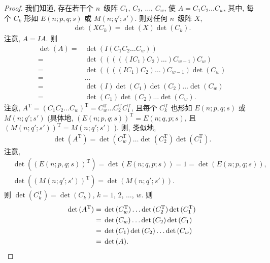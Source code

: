 \documentclass[../libro.tex]{subfiles}
\begin{document}
\begin{proof}
    我们知道,
    存在若干个 \(n\)~级阵
    \(C_1\), \(C_2\), \(\dots\), \(C_w\),
    使 \(A = C_1 C_2 \dots C_w\),
    其中, 每个 \(C_k\) 形如
    \(E(n; p, q; s)\) 或 \(M(n; q'; s')\).
    则对任何 \(n\)~级阵 \(X\),
    \begin{align*}
        \det {(X C_k)} = \det {(X)} \det {(C_k)}.
    \end{align*}
    注意, \(A = I A\).
    则
    \begin{align*}
        \det {(A)}
        = {} &
        \det {(I (C_1 C_2 \dots C_w))}
        \\
        = {} &
        \det {(((((I C_1) C_2) \dots) C_{w-1}) C_w)}
        \\
        = {} &
        \det {((((I C_1) C_2) \dots) C_{w-1})}
        \det {(C_w)}
        \\
        = {} &
        \dots
        \\
        = {} &
        \det {(I)} \det {(C_1)} \det {(C_2)} \dots \det {(C_w)}
        \\
        = {} &
        \det {(C_1)} \det {(C_2)} \dots \det {(C_w)}.
    \end{align*}
    注意,
    \(
        A^{\mathrm{T}}
        = (C_1 C_2 \dots C_w)^{\mathrm{T}}
        = C_w^{\mathrm{T}} \dots C_2^{\mathrm{T}} C_1^{\mathrm{T}}
    \),
    且每个 \(C_k^{\mathrm{T}}\) 也形如
    \(E(n; p, q; s)\) 或 \(M(n; q'; s')\)
    (具体地, %
    \((E(n; p, q; s))^{\mathrm{T}} = E(n; q, p; s)\),
    且
    \((M(n; \allowbreak
                q'; \allowbreak
        s'))^{\mathrm{T}}
        = M(n; \allowbreak
            q'; \allowbreak
    s')\)%
    ). %
    则, 类似地,
    \begin{align*}
        \det {(A^{\mathrm{T}})}
        = \det {(C_w^{\mathrm{T}})}
        \dots
        \det {(C_2^{\mathrm{T}})}
        \det {(C_1^{\mathrm{T}})}.
    \end{align*}
    注意,
    \begin{align*}
        &
        \det {((E(n; p, q; s))^{\mathrm{T}})}
        = \det {(E(n; q, p; s))} = 1 = \det {(E(n; p, q; s))},
        \\
        &
        \det {((M(n; q'; s'))^{\mathrm{T}})}
        = \det {(M(n; q'; s'))}.
    \end{align*}
    则 \(\det {(C_k^{\mathrm{T}})} = \det {(C_k)}\),
    \(k = 1\), \(2\), \(\dots\), \(w\).
    则
    \begin{align*}
        \det {(A^{\mathrm{T}})}
        = {} &
        \det {(C_w^{\mathrm{T}})}
        \dots
        \det {(C_2^{\mathrm{T}})}
        \det {(C_1^{\mathrm{T}})}
        \\
        = {} &
        \det {(C_w)} \dots \det {(C_2)} \det {(C_1)}
        \\
        = {} &
        \det {(C_1)} \det {(C_2)} \dots \det {(C_w)}
        \\
        = {} &
        \det {(A)}.
        \qedhere
    \end{align*}
\end{proof}
\end{document}
